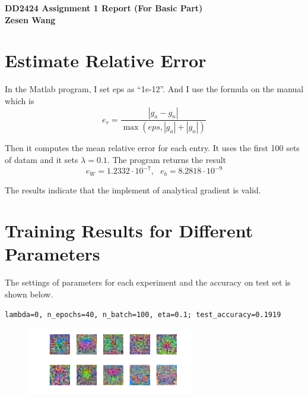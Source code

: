 

\usepackage{tikz}
\usepackage{graphicx}
\usepackage{amssymb}
\usepackage{amsmath}
\usepackage{harpoon}
\usepackage{float}
\usepackage{enumerate}
\usepackage{algorithm}
\usepackage{algpseudocode}
\usepackage{subcaption}
\usepackage{bm}
\usepackage{listings}


\usetikzlibrary{fit,positioning}


\begin{flushleft}

\bf{DD2424 Assignment 1 Report (For Basic Part)} \\
\bf{Zesen Wang} \\



\end{flushleft}



\section{Estimate Relative Error}

In the Matlab program, I set eps as ``1e-12''. And I use the formula on the manual which is
\[
	e_r=\frac{|g_a-g_n|}{\max(eps, |g_a|+|g_n|)}
\]

Then it computes the mean relative error for each entry. It uses the first 100 sets of datam and it sets $\lambda=0.1$. The program returns the result
\[
	e_W = 1.2332\cdot 10^{-7},\,\,\,\,e_b=8.2818\cdot 10^{-9}
\]

The results indicate that the implement of analytical gradient is valid.

\section{Training Results for Different Parameters}

The settings of parameters for each experiment and the accuracy on test set is shown below.

\begin{verbatim}
lambda=0, n_epochs=40, n_batch=100, eta=0.1; test_accuracy=0.1919
\end{verbatim}

\begin{figure}[h!]
	\centering
	\includegraphics[width=0.65\textwidth]{../Result_Pics/w1.png}
\end{figure}

